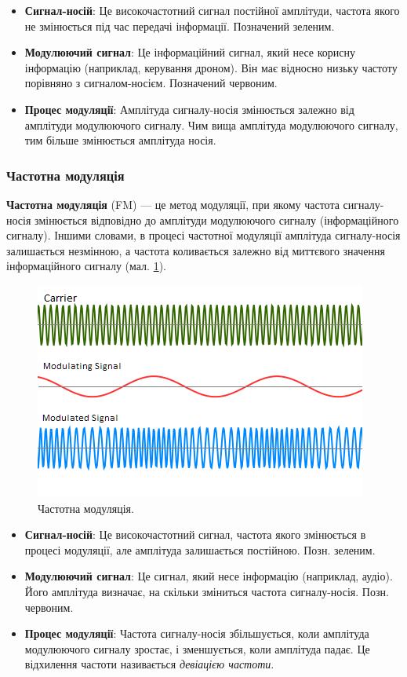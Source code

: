 \documentclass{article}
\begin{document}
\begin{itemize}[noitemsep, topsep=8pt]
\item \textbf{Сигнал-носій}: Це високочастотний сигнал постійної амплітуди, частота якого не змінюється під час передачі інформації. Позначений зеленим.
\item \textbf{Модулюючий сигнал}: Це інформаційний сигнал, який несе корисну інформацію (наприклад, керування дроном). Він має відносно низьку частоту порівняно з сигналом-носієм. Позначений червоним.
\item \textbf{Процес модуляції}: Амплітуда сигналу-носія змінюється залежно від амплітуди модулюючого сигналу. Чим вища амплітуда модулюючого сигналу, тим більше змінюється амплітуда носія.
\end{itemize}

\subsubsection{Частотна модуляція}

\textbf{Частотна модуляція} (FM) --- це метод модуляції, при якому частота сигналу-носія змінюється відповідно до амплітуди модулюючого сигналу (інформаційного сигналу). Іншими словами, в процесі частотної модуляції амплітуда сигналу-носія залишається незмінною, а частота коливається залежно від миттєвого значення інформаційного сигналу (мал. \ref{fig:fm}).

\begin{figure}[h!]
\centering
\includegraphics[width=0.6\linewidth]{images/fm.png}
\caption{\label{fig:fm}Частотна модуляція.}
\end{figure}

\begin{itemize}[noitemsep, topsep=8pt]
\item \textbf{Сигнал-носій}: Це високочастотний сигнал, частота якого змінюється в процесі модуляції, але амплітуда залишається постійною. Позн. зеленим.
\item \textbf{Модулюючий сигнал}: Це сигнал, який несе інформацію (наприклад, аудіо). Його амплітуда визначає, на скільки зміниться частота сигналу-носія. Позн. червоним.
\item \textbf{Процес модуляції}: Частота сигналу-носія збільшується, коли амплітуда модулюючого сигналу зростає, і зменшується, коли амплітуда падає. Це відхилення частоти називається \textit{девіацією частоти}.
\end{itemize}
\end{document}
